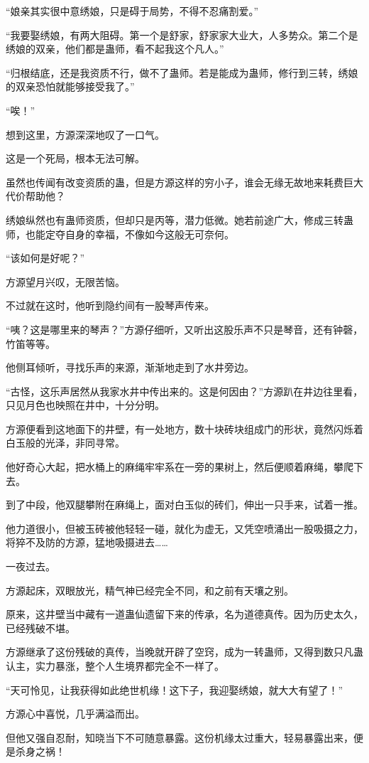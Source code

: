 \begin{this_body}
“娘亲其实很中意绣娘，只是碍于局势，不得不忍痛割爱。”

“我要娶绣娘，有两大阻碍。第一个是舒家，舒家家大业大，人多势众。第二个是绣娘的双亲，他们都是蛊师，看不起我这个凡人。”

“归根结底，还是我资质不行，做不了蛊师。若是能成为蛊师，修行到三转，绣娘的双亲恐怕就能够接受我了。”

“唉！”

想到这里，方源深深地叹了一口气。

这是一个死局，根本无法可解。

虽然也传闻有改变资质的蛊，但是方源这样的穷小子，谁会无缘无故地来耗费巨大代价帮助他？

绣娘纵然也有蛊师资质，但却只是丙等，潜力低微。她若前途广大，修成三转蛊师，也能定夺自身的幸福，不像如今这般无可奈何。

“该如何是好呢？”

方源望月兴叹，无限苦恼。

不过就在这时，他听到隐约间有一股琴声传来。

“咦？这是哪里来的琴声？”方源仔细听，又听出这股乐声不只是琴音，还有钟磬，竹笛等等。

他侧耳倾听，寻找乐声的来源，渐渐地走到了水井旁边。

“古怪，这乐声居然从我家水井中传出来的。这是何因由？”方源趴在井边往里看，只见月色也映照在井中，十分分明。

方源便看到这地面下的井壁，有一处地方，数十块砖块组成门的形状，竟然闪烁着白玉般的光泽，非同寻常。

他好奇心大起，把水桶上的麻绳牢牢系在一旁的果树上，然后便顺着麻绳，攀爬下去。

到了中段，他双腿攀附在麻绳上，面对白玉似的砖们，伸出一只手来，试着一推。

他力道很小，但被玉砖被他轻轻一碰，就化为虚无，又凭空喷涌出一股吸摄之力，将猝不及防的方源，猛地吸摄进去……

一夜过去。

方源起床，双眼放光，精气神已经完全不同，和之前有天壤之别。

原来，这井壁当中藏有一道蛊仙遗留下来的传承，名为道德真传。因为历史太久，已经残破不堪。

方源继承了这份残破的真传，当晚就开辟了空窍，成为一转蛊师，又得到数只凡蛊认主，实力暴涨，整个人生境界都完全不一样了。

“天可怜见，让我获得如此绝世机缘！这下子，我迎娶绣娘，就大大有望了！”

方源心中喜悦，几乎满溢而出。

但他又强自忍耐，知晓当下不可随意暴露。这份机缘太过重大，轻易暴露出来，便是杀身之祸！


\end{this_body}
